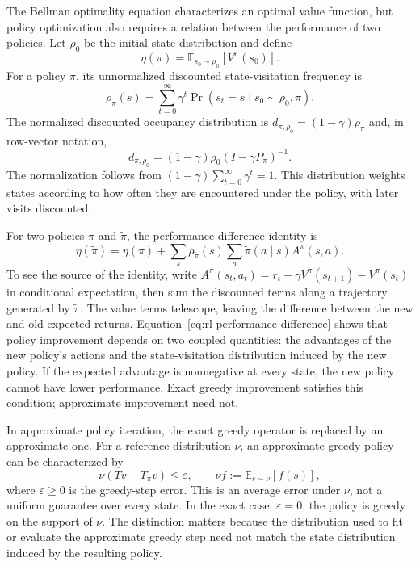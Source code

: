 The Bellman optimality equation characterizes an optimal value function, but
policy optimization also requires a relation between the performance of two
policies. Let $\rho_0$ be the initial-state distribution and define
\begin{equation}
    \eta(\pi)=\mathbb{E}_{s_0\sim\rho_0}[V^\pi(s_0)].
    \label{eq:rl-policy-performance}
\end{equation}
For a policy $\pi$, its unnormalized discounted state-visitation frequency is
\begin{equation}
    \rho_\pi(s)
    =\sum_{t=0}^{\infty}\gamma^t
      \Pr(s_t=s\mid s_0\sim\rho_0,\pi).
    \label{eq:rl-discounted-occupancy}
\end{equation}
The normalized discounted occupancy distribution is
$d_{\pi,\rho_0}=(1-\gamma)\rho_\pi$ and, in row-vector notation,
\begin{equation}
    d_{\pi,\rho_0}
    =(1-\gamma)\rho_0(I-\gamma P_\pi)^{-1}.
    \label{eq:rl-normalized-occupancy}
\end{equation}
The normalization follows from
$(1-\gamma)\sum_{t=0}^{\infty}\gamma^t=1$. This distribution weights states
according to how often they are encountered under the policy, with later
visits discounted.

For two policies $\pi$ and $\widetilde\pi$, the performance difference
identity is
\begin{equation}
    \eta(\widetilde\pi)
    =\eta(\pi)
    +\sum_s\rho_{\widetilde\pi}(s)
      \sum_a\widetilde\pi(a\mid s)A^\pi(s,a).
    \label{eq:rl-performance-difference}
\end{equation}
To see the source of the identity, write
$A^\pi(s_t,a_t)=r_t+\gamma V^\pi(s_{t+1})-V^\pi(s_t)$ in conditional expectation,
then sum the discounted terms along a trajectory generated by $\widetilde\pi$.
The value terms telescope, leaving the difference between the new and old
expected returns. Equation~\cref{eq:rl-performance-difference} shows that
policy improvement depends on two coupled quantities: the advantages of the
new policy's actions and the state-visitation distribution induced by the new
policy. If the expected advantage is nonnegative at every state, the new policy
cannot have lower performance. Exact greedy improvement satisfies this
condition; approximate improvement need not.

In approximate policy iteration, the exact greedy operator is replaced by an
approximate one. For a reference distribution $\nu$, an approximate greedy
policy can be characterized by
\begin{equation}
    \nu(Tv-T_\pi v)\leq\varepsilon,
    \qquad
    \nu f:=\mathbb{E}_{s\sim\nu}[f(s)],
    \label{eq:rl-approx-greedy}
\end{equation}
where $\varepsilon\geq0$ is the greedy-step error. This is an average error
under $\nu$, not a uniform guarantee over every state. In the exact case,
$\varepsilon=0$, the policy is greedy on the support of $\nu$. The distinction
matters because the distribution used to fit or evaluate the approximate greedy
step need not match the state distribution induced by the resulting policy.

